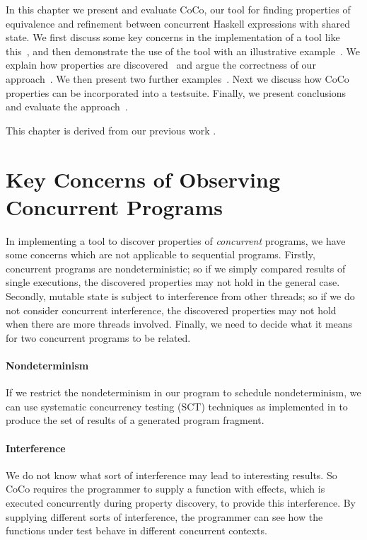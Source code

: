 In this chapter we present and evaluate CoCo, our tool for finding
properties of equivalence and refinement between concurrent Haskell
expressions with shared state.  We first discuss some key concerns in
the implementation of a tool like this~, and then
demonstrate the use of the tool with an illustrative
example~.  We explain how properties are
discovered~ and argue the correctness of our
approach~.  We then present two further
examples~.  Next we discuss how CoCo properties can
be incorporated into a \dejafu{} testsuite.  Finally, we present
conclusions and evaluate the approach~.

This chapter is derived from our previous work .

\section{Key Concerns of Observing Concurrent Programs}
\label{sec:coco-concerns}

In implementing a tool to discover properties of \emph{concurrent}
programs, we have some concerns which are not applicable to sequential
programs.  Firstly, concurrent programs are nondeterministic; so if we
simply compared results of single executions, the discovered
properties may not hold in the general case.  Secondly, mutable state
is subject to interference from other threads; so if we do not
consider concurrent interference, the discovered properties may not
hold when there are more threads involved.  Finally, we need to decide
what it means for two concurrent programs to be related.

\paragraph{Nondeterminism}
If we restrict the nondeterminism in our program to schedule
nondeterminism, we can use systematic concurrency testing
(SCT)\cite{coons2013,musuvathi2008,musuvathi2007,flanagan2005}
techniques as implemented in \dejafu{} to produce the set of results
of a generated program fragment.

\paragraph{Interference}
We do not know what sort of interference may lead to interesting
results.  So CoCo requires the programmer to supply a function with
effects, which is executed concurrently during property discovery, to
provide this interference.  By supplying different sorts of
interference, the programmer can see how the functions under test
behave in different concurrent contexts.

